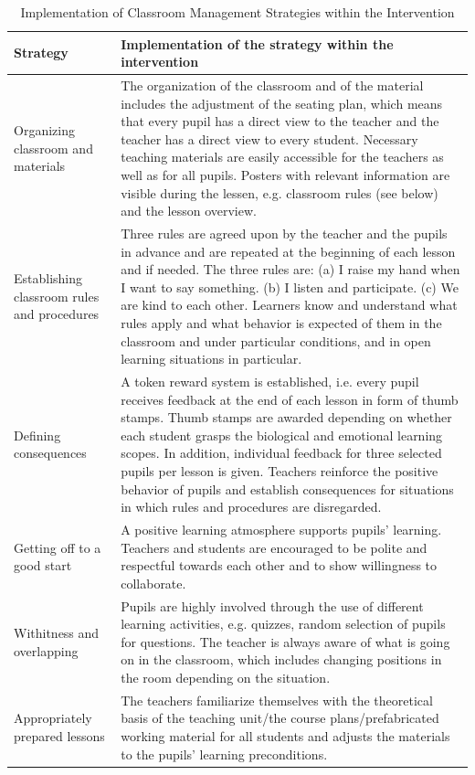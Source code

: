 \documentclass[11.5pt]{sig-alternate} %
\begin{document}
\begin{large}
\begin{table}[thbp]
\caption{Implementation of Classroom Management Strategies within the Intervention}
\begin{tabular}{ll}
\hline
Strategy & Implementation of the strategy within the intervention \\ \hline
Organizing classroom and materials & The organization of the classroom and of the material includes the adjustment of the seating plan, which means that every pupil has a direct view to the teacher and the teacher has a direct view to every student. Necessary teaching materials are easily accessible for the teachers as well as for all pupils. Posters with relevant information are visible during the lessen, e.g. classroom rules (see below) and the lesson overview. \\
Establishing classroom rules and procedures & Three rules are agreed upon by the teacher and the pupils in advance and are repeated at the beginning of each lesson and if needed. The three rules are: (a) I raise my hand when I want to say something. (b) I listen and participate. (c) We are kind to each other. Learners know and understand what rules apply and what behavior is expected of them in the classroom and under particular conditions, and in open learning situations in particular. \\
Defining consequences & A token reward system is established, i.e. every pupil receives feedback at the end of each lesson in form of thumb stamps. Thumb stamps are awarded depending on whether each student grasps the biological and emotional learning scopes. In addition, individual feedback for three selected pupils per lesson is given. Teachers reinforce the positive behavior of pupils and establish consequences for situations in which rules and procedures are disregarded. \\
Getting off to a good start & A positive learning atmosphere supports pupils' learning. Teachers and students are encouraged to be polite and respectful towards each other and to show willingness to collaborate. \\
Withitness and overlapping & Pupils are highly involved through the use of different learning activities, e.g. quizzes, random selection of pupils for questions. The teacher is always aware of what is going on in the classroom, which includes changing positions in the room depending on the situation. \\
Appropriately prepared lessons & The teachers familiarize themselves with the theoretical basis of the teaching unit/the course plans/prefabricated working material for all students and adjusts the materials to the pupils' learning preconditions. \\

\end{tabular}
\end{table}
\end{large}
\end{document}
